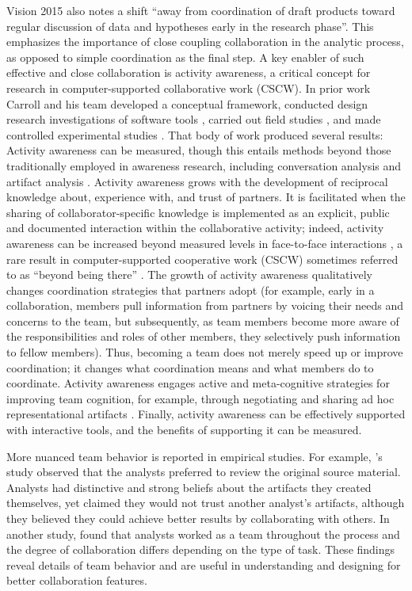 Vision 2015 also notes a shift “away from coordination of draft products toward regular discussion of data and hypotheses early in the research phase”. This emphasizes the importance of close coupling collaboration in the analytic process, as opposed to simple coordination as the final step. A key enabler of such effective and close collaboration is activity awareness, a critical concept for research in computer-supported collaborative work (CSCW). In prior work Carroll and his team \citep{Carroll2003, Carroll2011j} developed a conceptual framework, conducted design research investigations of software tools \cite{Carroll2003,Carroll2009i,Ganoe2003}, carried out field studies \citep{Ganoe2003,schafer2008emergency}, and made controlled experimental studies \citep{Convertino2008,Convertino2009,Convertino2011}. That body of work produced several results: Activity awareness can be measured, though this entails methods beyond those traditionally employed in awareness research, including conversation analysis \citep{sacks1995lectures} and artifact analysis \citep{fleming1974artifact,pearce1994thinking}. Activity awareness grows with the development of reciprocal knowledge about, experience with, and trust of partners. It is facilitated when the sharing of collaborator-specific knowledge is implemented as an explicit, public and documented interaction within the collaborative activity; indeed, activity awareness can be increased beyond measured levels in face-to-face interactions \citep{Convertino2011}, a rare result in computer-supported cooperative work (CSCW) sometimes referred to as “beyond being there” \citep{hollan1992beyond}. The growth of activity awareness qualitatively changes coordination strategies that partners adopt (for example, early in a collaboration, members pull information from partners by voicing their needs and concerns to the team, but subsequently, as team members become more aware of the responsibilities and roles of other members, they selectively push information to fellow members). Thus, becoming a team does not merely speed up or improve coordination; it changes what coordination means and what members do to coordinate. Activity awareness engages active and meta-cognitive strategies for improving team cognition, for example, through negotiating and sharing ad hoc representational artifacts \citep{Carroll2013}. Finally, activity awareness can be effectively supported with interactive tools, and the benefits of supporting it can be measured. 

More nuanced team behavior is reported in empirical studies. For example, \cite{Chin2009}'s study observed that the analysts  preferred to review the original source material.  Analysts had distinctive and strong beliefs about the artifacts they created themselves, yet claimed they would not trust another analyst’s artifacts, although they believed they could achieve better results by collaborating with others. In another study, \cite{Kang2012b} found that analysts worked as a team throughout the process and the degree of collaboration differs depending on the type of task. These findings reveal details of team behavior and are useful in understanding and designing for better collaboration features.


